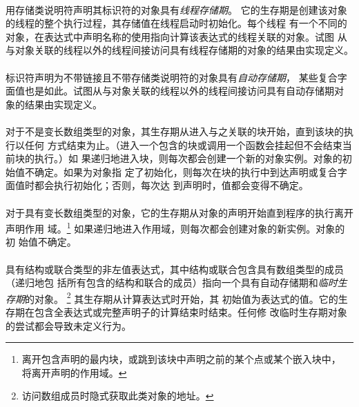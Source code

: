 {\paragraph{}
用存储类说明符声明其标识符的对象具有\textit{线程存储期}。
它的生存期是创建该对象的线程的整个执行过程，其存储值在线程启动时初始化。每个线程
有一个不同的对象，在表达式中声明名称的使用指向计算该表达式的线程关联的对象。试图
从与对象关联的线程以外的线程间接访问具有线程存储期的对象的结果由实现定义。

\paragraph{}
标识符声明为不带链接且不带存储类说明符的对象具有\textit{自动存储期}，
某些复合字面值也是如此。试图从与对象关联的线程以外的线程间接访问具有自动存储期对
象的结果由实现定义。

\paragraph{}
对于不是变长数组类型的对象，其生存期从进入与之关联的块开始，直到该块的执行以任何
方式结束为止。（进入一个包含的块或调用一个函数会挂起但不会结束当前块的执行。）如
果递归地进入块，则每次都会创建一个新的对象实例。对象的初始值不确定。如果为对象指
定了初始化，则每次在块的执行中到达声明或复合字面值时都会执行初始化；否则，每次达
到声明时，值都会变得不确定。

\paragraph{}
对于具有变长数组类型的对象，它的生存期从对象的声明开始直到程序的执行离开声明作用
域。\footnote{离开包含声明的最内块，或跳到该块中声明之前的某个点或某个嵌入块中，
将离开声明的作用域。} 如果递归地进入作用域，则每次都会创建对象的新实例。对象的初
始值不确定。

\paragraph{}
具有结构或联合类型的非左值表达式，其中结构或联合包含具有数组类型的成员（递归地包
括所有包含的结构和联合的成员）指向一个具有自动存储期和\textit{临时生存期}的对象。
\footnote{访问数组成员时隐式获取此类对象的地址。} 其生存期从计算表达式时开始，其
初始值为表达式的值。它的生存期在包含全表达式或完整声明子的计算结束时结束。任何修
改临时生存期对象的尝试都会导致未定义行为。


}
